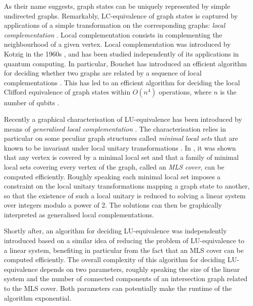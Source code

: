 \documentclass[a4paper,UKenglish,cleveref,autoref,thm-restate]{arxiv}
\begin{document}
As their name suggests, graph states can be uniquely represented by simple undirected graphs. Remarkably, LC-equivalence of graph states is captured by applications of a simple transformation on the corresponding graphs: \emph{local complementation} \cite{VandenNest04}. Local complementation consists in complementing the neighbourhood of a given vertex. Local complementation was introduced by Kotzig in the 1960s \cite{Kotzig68}, and has been studied independently of its applications in quantum computing. In particular, Bouchet has introduced an efficient algorithm for deciding whether two graphs are related by a sequence of local complementations \cite{Bouchet1991}. This has led to an efficient algorithm for deciding the local Clifford equivalence of graph states within $O(n^4)$ operations, where $n$ is the number of qubits \cite{VdnEfficientLC}. 


Recently a graphical characterisation of LU-equivalence has been introduced by means of \emph{generalised local complementation} \cite{claudet2024local}. The characterisation relies in particular on some peculiar graph structures called \emph{minimal local sets} that are known to be invariant under local unitary transformations \cite{Perdrix06}. In \cite{claudet2024covering}, it was shown that any vertex is covered by a minimal local set and that a family of minimal local sets covering every vertex of the graph, called an \emph{MLS cover}, can be computed efficiently. Roughly speaking each minimal local set imposes a constraint on the local unitary transformations mapping a graph state to another, so that the existence of such a local unitary is reduced to solving a linear system  over integers modulo a power of 2. The solutions can then be graphically interpreted as generalised local complementations. 

Shortly after, an algorithm for deciding LU-equivalence was independently  introduced \cite{burchardt2024algorithmverifylocalequivalence} based on a similar idea of reducing the problem of LU-equivalence to a linear system, benefiting in particular from the fact that an MLS cover can be computed efficiently. The overall complexity of this algorithm for deciding LU-equivalence depends on two parameters, roughly speaking the size of the linear system and the number of connected components of an intersection graph related to the MLS cover. Both parameters can potentially make the runtime of the algorithm exponential. 
\end{document}
